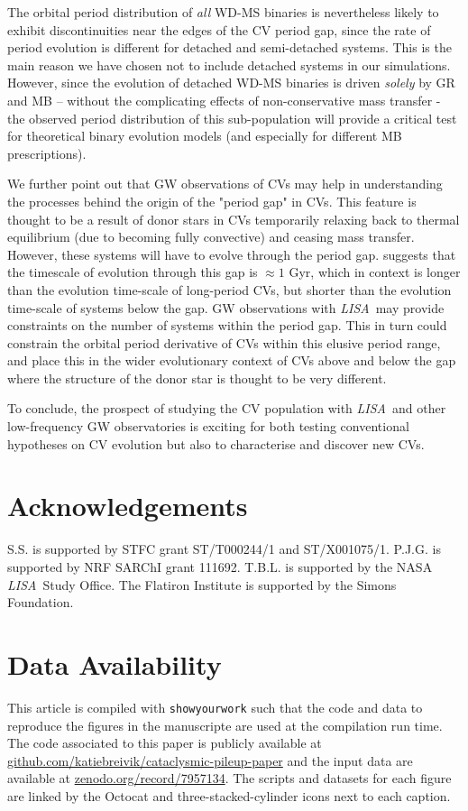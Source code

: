 \documentclass[fleqn,usenatbib]{mnras}
\newcommand{\lisa}{{\it LISA}}
\begin{document}
The orbital period distribution of {\em all} WD-MS binaries is nevertheless likely to exhibit discontinuities near the edges of the CV period gap, since the rate of period evolution is different for detached and semi-detached systems. This is the main reason we have chosen not to include detached systems in our simulations. However, since the 
evolution of detached WD-MS binaries is driven {\em solely} by GR and MB -- without the complicating effects of non-conservative mass transfer - the observed period distribution of this sub-population will provide a critical test for theoretical binary evolution models (and especially for different MB prescriptions). 

We further point out that GW observations of CVs may help in understanding the processes behind the origin of the "period gap" in CVs. This feature is thought to be a result of donor stars in CVs temporarily relaxing back to thermal equilibrium (due to becoming fully convective) and ceasing mass transfer. However, these systems will have to evolve through the period gap. \cite{knigge11} suggests that the timescale of evolution through this gap is $\approx 1$ Gyr, which in context is longer than the evolution time-scale of long-period CVs, but shorter than the evolution time-scale of systems below the gap. GW observations with \lisa\ may provide constraints on the number of systems within the period gap. This in turn could constrain the orbital period derivative of CVs within this elusive period range, and place this in the wider evolutionary context of CVs above and below the gap where the structure of the donor star is thought to be very different.

To conclude, the prospect of studying the CV population with \lisa\ and other low-frequency GW observatories is exciting for both testing conventional hypotheses on CV evolution but also to characterise and discover new CVs. 


\section*{Acknowledgements}
S.S. is supported by STFC grant ST/T000244/1 and ST/X001075/1. P.J.G. is supported by NRF SARChI grant 111692. T.B.L. is supported by the NASA \lisa\ Study Office. The Flatiron Institute is supported by the Simons Foundation.


\section*{Data Availability}
This article is compiled with \texttt{showyourwork} \citep{luger21} such that the code and data to reproduce the figures in the manuscripte are used at the compilation run time. The code associated to this paper is publicly available at \href{github.com/katiebreivik/cataclysmic-pileup-pape}{github.com/katiebreivik/cataclysmic-pileup-paper} and the input data are available at \href{zenodo.org/record/7957134}{zenodo.org/record/7957134}. The scripts and datasets for each figure are linked by the Octocat and  three-stacked-cylinder icons next to each caption.
\end{document}

